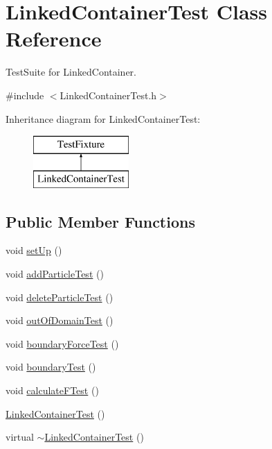 \hypertarget{classLinkedContainerTest}{}\section{Linked\+Container\+Test Class Reference}
\label{classLinkedContainerTest}


Test\+Suite for Linked\+Container.  




{\ttfamily \#include $<$Linked\+Container\+Test.\+h$>$}

Inheritance diagram for Linked\+Container\+Test\+:\begin{figure}[H]
\begin{center}
\leavevmode
\includegraphics[height=2.000000cm]{classLinkedContainerTest}
\end{center}
\end{figure}
\subsection*{Public Member Functions}
\begin{DoxyCompactItemize}
\item 
void \hyperlink{classLinkedContainerTest_ad4c24c445d295e8ce6fd350e0d4d9fab}{set\+Up} ()
\item 
void \hyperlink{classLinkedContainerTest_a1afa7e2cd6633b6fef51fd403116baef}{add\+Particle\+Test} ()
\item 
void \hyperlink{classLinkedContainerTest_ab185ef32b0adc7be7b6de3baf007d8e2}{delete\+Particle\+Test} ()
\item 
void \hyperlink{classLinkedContainerTest_a7ce227622a1298dadc7027f9f8e4b850}{out\+Of\+Domain\+Test} ()
\item 
void \hyperlink{classLinkedContainerTest_a8a3c4f33b08c4c63acb05cd5b47fe2b8}{boundary\+Force\+Test} ()
\item 
void \hyperlink{classLinkedContainerTest_a3ea7a9a7335bc8d20c829bb7d0cd05ba}{boundary\+Test} ()
\item 
void \hyperlink{classLinkedContainerTest_adcf6642009e1818aad463c19f810b07c}{calculate\+F\+Test} ()
\item 
\hyperlink{classLinkedContainerTest_ab8351f042795c8508d360369e1900d3d}{Linked\+Container\+Test} ()
\item 
virtual \hyperlink{classLinkedContainerTest_a0d507051259d6878affd659cb771417e}{$\sim$\+Linked\+Container\+Test} ()
\end{DoxyCompactItemize}
